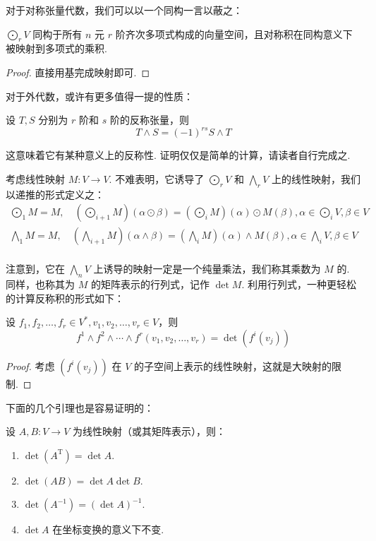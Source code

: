 对于对称张量代数，我们可以以一个同构一言以蔽之：

\begin{theorem}{}{}
    $\bigodot_r V$ 同构于所有 $n$ 元 $r$ 阶齐次多项式构成的向量空间，且对称积在同构意义下被映射到多项式的乘积.
\end{theorem}

\begin{proof}
    直接用基完成映射即可.
\end{proof}

对于外代数，或许有更多值得一提的性质：

\begin{lemma}{}{}
    设 $T, S$ 分别为 $r$ 阶和 $s$ 阶的反称张量，则\[
    T \wedge S = (-1)^{r s} S \wedge T
    \]
\end{lemma}

这意味着它有某种意义上的反称性. 证明仅仅是简单的计算，请读者自行完成之.

考虑线性映射 $M: V \to V$. 不难表明，它诱导了 $\bigodot_r V$ 和 $\bigwedge_r V$ 上的线性映射，我们以递推的形式定义之：
\begin{align*}
\bigodot_1 M = M, \quad (\bigodot_{i + 1} M) (\alpha \odot \beta) = (\bigodot_i M) (\alpha) \odot M (\beta), \alpha \in \bigodot_i V, \beta \in V \\
\bigwedge_1 M = M, \quad (\bigwedge_{i + 1} M) (\alpha \wedge \beta) = (\bigwedge_i M) (\alpha) \wedge M (\beta), \alpha \in \bigwedge_i V, \beta \in V \\
\end{align*}

注意到，它在 $\bigwedge_n V$ 上诱导的映射一定是一个纯量乘法，我们称其乘数为 $M$ 的. 同样，也称其为 $M$ 的矩阵表示的行列式，记作 $\det M$. 利用行列式，一种更轻松的计算反称积的形式如下：

\begin{theorem}{}{}
    设 $f_1, f_2, \ldots, f_r \in V^*, v_1, v_2, \ldots, v_r \in V$，则\[
    f^1 \wedge f^2 \wedge \cdots \wedge f^r (v_1, v_2, \ldots, v_r) = \det (f^i (v_j))
    \]
\end{theorem}

\begin{proof}
    考虑 $(f^i (v_j))$ 在 $V$ 的子空间上表示的线性映射，这就是大映射的限制.
\end{proof}

下面的几个引理也是容易证明的：

\begin{lemma}{}{}
    设 $A, B: V \to V$ 为线性映射（或其矩阵表示），则：
    \begin{enumerate}
        \item $\det(A^\mathrm{T}) = \det A$.
        \item $\det(A B) = \det A \det B$.
        \item $\det(A^{-1}) = (\det A)^{-1}$.
        \item $\det A$ 在坐标变换的意义下不变.
    \end{enumerate}
\end{lemma}

